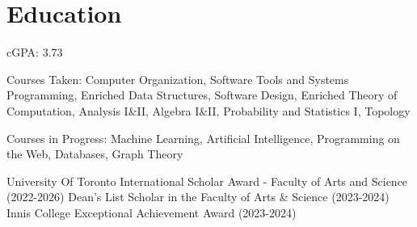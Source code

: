 \documentclass[letterpaper,10pt]{article}
\begin{document}

    \section{Education}

        \begin{resume_list}
            \item cGPA: 3.73
            \item Courses Taken: Computer Organization, Software Tools and Systems Programming, Enriched Data Structures, Software Design, Enriched Theory of Computation, %
            Analysis I\&II, Algebra I\&II, Probability and Statistics I, Topology
            \item Courses in Progress: Machine Learning, Artificial Intelligence, Programming on the Web, Databases, Graph Theory
            \item University Of Toronto International Scholar Award - Faculty of Arts and Science (2022-2026)
            Dean’s List Scholar in the Faculty of Arts \& Science (2023-2024)
            Innis College Exceptional Achievement Award (2023-2024)
        \end{resume_list}


\end{document}
